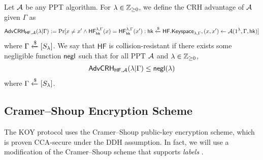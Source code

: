 Let $\mathcal{A}$ be any PPT algorithm. For $\lambda\in\mathbb{Z}_{\geq 0}$, we define the CRH advantage of $\mathcal{A}$ given $\Gamma$ as $$\mathsf{AdvCRH}_{\mathsf{HF},\mathcal{A}}(\lambda | \Gamma):=\Pr[x\neq x'\wedge\mathsf{HF}_{\mathsf{hk}}^{\lambda,\Gamma}(x)=\mathsf{HF}_{\mathsf{hk}}^{\lambda,\Gamma}(x'): \mathsf{hk}\xleftarrow{\$}\mathsf{HF.Keyspace}_{\lambda,\Gamma}, (x,x')\gets\mathcal{A}(1^\lambda,\Gamma,\mathsf{hk})]$$
where $\Gamma\xleftarrow{\$}[S_\lambda]$. We say that $\mathsf{HF}$ is collision-resistant if there exists some negligible function $\mathsf{negl}$ such that for all PPT $\mathcal{A}$ and $\lambda\in\mathbb{Z}_{\geq 0}$, $$\mathsf{AdvCRH}_{\mathsf{HF},\mathcal{A}}(\lambda|\Gamma)\leq\mathsf{negl}(\lambda)$$ where $\Gamma\xleftarrow{\$}[S_\lambda]$.

\subsection{Cramer--Shoup Encryption Scheme}

The KOY protocol uses the Cramer--Shoup public-key encryption scheme, which is proven CCA-secure under the DDH assumption. In fact, we will use a modification of the Cramer--Shoup scheme that supports \textit{labels} \cite{EC:KatOstYun01, iso}.

